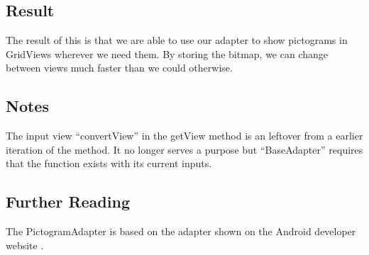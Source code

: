 \subsection*{Result}
The result of this is that we are able to use our adapter to show pictograms in GridViews wherever we need them.
By storing the bitmap, we can change between views much faster than we could otherwise.

\subsection*{Notes}
The input view ``convertView'' in the getView method is an leftover from a earlier iteration of the method. It no longer serves a purpose but ``BaseAdapter'' requires that the function exists with its current inputs.\\

\subsection*{Further Reading}

The PictogramAdapter is based on the adapter shown on the Android developer website \cite{gridview}.